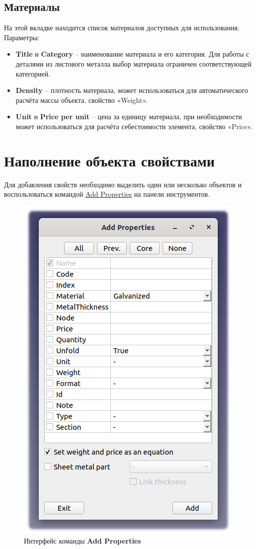 \documentclass[a4paper,12pt]{article}
\begin{document}
\subsection{Материалы}
На этой вкладке находится список материалов доступных для использования. Параметры:
\begin{itemize}
    \item \textbf{Title} и \textbf{Category} -- наименование материала и его категория. Для работы с деталями из листового металла выбор материала ограничен соответствующей категорией.
    \item \textbf{Density} -- плотность материала, может использоваться для автоматического расчёта массы объекта, свойство «Weight».
    \item \textbf{Unit} и \textbf{Price per unit} -- цена за единицу материала, при необходимости может использоваться для расчёта себестоимости элемента, свойство «Price».
\end{itemize}

\pagebreak


\section{Наполнение объекта свойствами}

Для добавления свойств необходимо выделить один или несколько объектов и воспользоваться командой \hyperref[sec:5]{Add Properties} на панели инструментов.

\begin{figure}[htp]
	\centering
	\includegraphics[scale=0.7]{img/properties_add.png}
	\caption{Интерфейс команды \textbf{Add Properties}}
	\label{sec:properties_add}
\end{figure}
\end{document}
